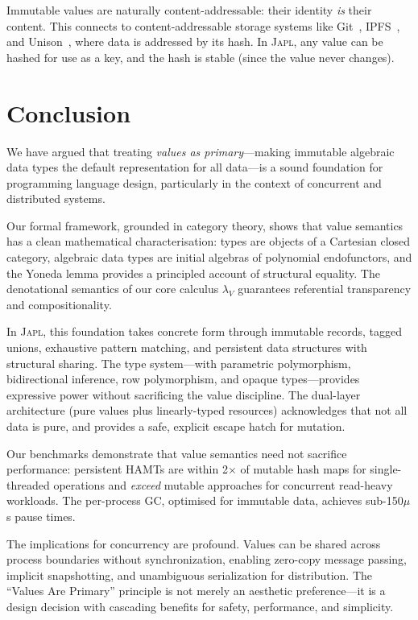 \documentclass[11pt]{article}
\theoremstyle{definition}
\theoremstyle{remark}
\newcommand{\japl}{\textsc{Japl}}
\begin{document}
Immutable values are naturally content-addressable: their identity
\emph{is} their content.  This connects to content-addressable storage
systems like Git~\cite{torvalds2005git}, IPFS~\cite{benet2014ipfs},
and Unison~\cite{chiusano2015unison}, where data is addressed by its
hash.  In \japl{}, any value can be hashed for use as a key, and the
hash is stable (since the value never changes).


\section{Conclusion}
\label{sec:conclusion}

We have argued that treating \emph{values as primary}---making
immutable algebraic data types the default representation for all
data---is a sound foundation for programming language design,
particularly in the context of concurrent and distributed systems.

Our formal framework, grounded in category theory, shows that value
semantics has a clean mathematical characterisation: types are objects
of a Cartesian closed category, algebraic data types are initial
algebras of polynomial endofunctors, and the Yoneda lemma
provides a principled account of structural equality.  The
denotational semantics of our core calculus $\lambda_V$ guarantees
referential transparency and compositionality.

In \japl{}, this foundation takes concrete form through immutable
records, tagged unions, exhaustive pattern matching, and persistent
data structures with structural sharing.  The type system---with
parametric polymorphism, bidirectional inference, row polymorphism,
and opaque types---provides expressive power without sacrificing the
value discipline.  The dual-layer architecture (pure values plus
linearly-typed resources) acknowledges that not all data is pure, and
provides a safe, explicit escape hatch for mutation.

Our benchmarks demonstrate that value semantics need not sacrifice
performance: persistent HAMTs are within 2$\times$ of mutable hash
maps for single-threaded operations and \emph{exceed} mutable
approaches for concurrent read-heavy workloads.  The per-process GC,
optimised for immutable data, achieves sub-150$\mu$s pause times.

The implications for concurrency are profound.  Values can be shared
across process boundaries without synchronization, enabling zero-copy
message passing, implicit snapshotting, and unambiguous serialization
for distribution.  The ``Values Are Primary'' principle is not merely
an aesthetic preference---it is a design decision with cascading
benefits for safety, performance, and simplicity.
\end{document}
